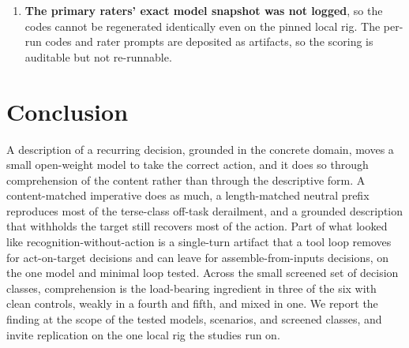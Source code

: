 \documentclass[11pt,a4paper]{article}
\begin{document}
\begin{enumerate}
    blind Claude subagents. To check their validity where it matters most, an author
    blind-scored a stratified subset of 39 casg-direct responses, weighted to the off-task
    codes that the length result turns on. The anchor confirmed the off-task coding that
    carries the length result. It also concentrated the human-versus-machine disagreements
    at one boundary: whether a reply that asserts or recommends the correct action, without
    performing it, counts as correct. The first-round rubric under-specified that boundary,
    and the length-control study had been scored by a single rater, so it credited some
    asserted or malformed actions as correct. We tightened the rubric and re-scored the four
    length-control classes blind with two raters and strict consensus, the method the other
    studies already used, with inter-rater agreement from 0.94 to 1.00. The correction
    lowered the absolute correct-action rates across all four classes, most on casg-direct
    and parent-state, where a reply can assert completion, and least on formal-step and
    conditional-gate, which have a checkable output. It did not change the load-bearing
    direction: on the terse class the neutral prefix still drives about as much off-task
    derailment as the glyph. One small-cell ordering did move, casg-direct's neutral prefix against its
    imperative, and the argument does not rest on it. The off-task mechanism that carries the
    length result is unchanged (Table~\ref{tab:neutral}). The anchor
    covers one class and one human scorer, and broad validity against a second model family
    remains future work.
  \item \textbf{The primary raters' exact model snapshot was not logged}, so the codes
    cannot be regenerated identically even on the pinned local rig. The per-run codes and
    rater prompts are deposited as artifacts, so the scoring is auditable but not
    re-runnable.
\end{enumerate}

\section{Conclusion}

A description of a recurring decision, grounded in the concrete domain, moves a small
open-weight model to take the correct action, and it does so through comprehension of
the content rather than through the descriptive form. A content-matched imperative does
as much, a length-matched neutral prefix reproduces most of the terse-class off-task
derailment, and a grounded description that withholds the target still recovers most of
the action. Part
of what looked like recognition-without-action is a single-turn artifact that a tool
loop removes for act-on-target decisions and can leave for assemble-from-inputs
decisions, on the one model and minimal loop tested.
Across the small screened set of decision classes, comprehension is the load-bearing
ingredient in three of the six with clean controls, weakly in a fourth and fifth, and mixed in one. We
report the finding at the scope of the tested models,
scenarios, and screened classes, and invite replication on the one local rig the studies
run on.
\end{document}

